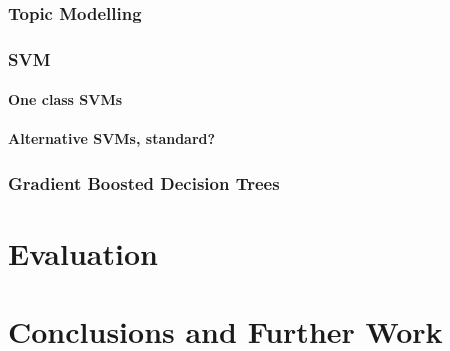 \documentclass[bsc,frontabs,singlespacing,parskip]{infthesis}     %
\begin{document}
\subsection{Topic Modelling}
\subsection{SVM}
\subsubsection{One class SVMs}
\subsubsection{Alternative SVMs, standard?}
\subsection{Gradient Boosted Decision Trees}
\chapter{Evaluation}
\chapter{Conclusions and Further Work}




\end{document}
